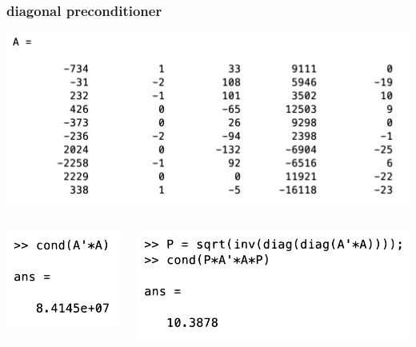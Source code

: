 \documentclass[compress]{beamer}
\begin{document}
\begin{frame}
	\frametitle{diagonal preconditioner}
	\begin{center}
		\includegraphics[width=.7\textwidth]{poorly_cond_a.png}
	\end{center}
	\vspace{2em}
	
	\begin{columns}[t]
		\begin{column}{0.3\textwidth}
			\vspace{-6.4em}
			
			\includegraphics[width=.8\textwidth]{cond1.png}
		\end{column}
		\begin{column}{0.7\textwidth}
			\includegraphics[width=.8\textwidth]{cond2.png}
		\end{column}
	\end{columns}
\end{frame}
\end{document}
